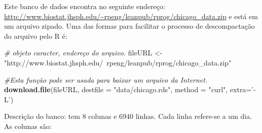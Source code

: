 \documentclass[]{book}
\newenvironment{Shaded}{\begin{snugshade}}{\end{snugshade}}
\newcommand{\CommentTok}[1]{\textcolor[rgb]{0.56,0.35,0.01}{\textit{#1}}}
\newcommand{\DataTypeTok}[1]{\textcolor[rgb]{0.13,0.29,0.53}{#1}}
\newcommand{\KeywordTok}[1]{\textcolor[rgb]{0.13,0.29,0.53}{\textbf{#1}}}
\newcommand{\NormalTok}[1]{#1}
\newcommand{\StringTok}[1]{\textcolor[rgb]{0.31,0.60,0.02}{#1}}
\begin{document}
Este banco de dados encontra no seguinte endereço: \url{http://www.biostat.jhsph.edu/~rpeng/leanpub/rprog/chicago_data.zip} e está em um arquivo zipado. Uma das formas para facilitar o processo de descompactação do arquivo pelo R é:

\begin{Shaded}
\begin{Highlighting}[]
\CommentTok{# objeto caracter, endereço do arquivo.}
\NormalTok{fileURL <-}\StringTok{ "http://www.biostat.jhsph.edu/~rpeng/leanpub/rprog/chicago_data.zip"}

\CommentTok{#Esta função pode ser usada para baixar um arquivo da Internet.}
\KeywordTok{download.file}\NormalTok{(fileURL, }\DataTypeTok{destfile =} \StringTok{"data/chicago.rds"}\NormalTok{, }\DataTypeTok{method =} \StringTok{"curl"}\NormalTok{, }\DataTypeTok{extra=}\StringTok{'-L'}\NormalTok{) }
\end{Highlighting}
\end{Shaded}

Descrição do banco: tem 8 colunas e 6940 linhas. Cada linha refere-se a um dia. As colunas são:
\end{document}
